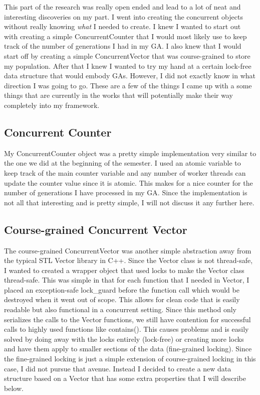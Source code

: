 \documentclass{acm_proc_article-sp}
\begin{document}
This part of the research was really open ended and lead to a lot of neat and interesting discoveries on my part. I went into creating the concurrent objects without really knowing \emph{what} I needed to create. I knew I wanted to start out with creating a simple ConcurrentCounter that I would most likely use to keep track of the number of generations I had in my GA. I also knew that I would start off by creating a simple ConcurrentVector that was course-grained to store my population. After that I knew I wanted to try my hand at a certain lock-free data structure that would embody GAs. However, I did not exactly know in what direction I was going to go. These are a few of the things I came up with a some things that are currently in the works that will potentially make their way completely into my framework.


\subsection{Concurrent Counter}

My ConcurrentCounter object was a pretty simple implementation very similar to the one we did at the beginning of the semester. I used an atomic variable to keep track of the main counter variable and any number of worker threads can update the counter value since it is atomic. This makes for a nice counter for the number of generations I have processed in my GA. Since the implementation is not all that interesting and is pretty simple, I will not discuss it any further here.


\subsection{Course-grained Concurrent Vector}

The course-grained ConcurrentVector was another simple abstraction away from the typical STL Vector library in C++. Since the Vector class is not thread-safe, I wanted to created a wrapper object that used locks to make the Vector class thread-safe. This was simple in that for each function that I needed in Vector, I placed an exception-safe lock\_guard before the function call which would be destroyed when it went out of scope. This allows for clean code that is easily readable but also functional in a concurrent setting. Since this method only serializes the calls to the Vector functions, we still have contention for successful calls to highly used functions like contains(). This causes problems and is easily solved by doing away with the locks entirely (lock-free) or creating more locks and have them apply to smaller sections of the data (fine-grained locking). Since the fine-grained locking is just a simple extension of course-grained locking in this case, I did not pursue that avenue. Instead I decided to create a new data structure based on a Vector that has some extra properties that I will describe below.
\end{document}
